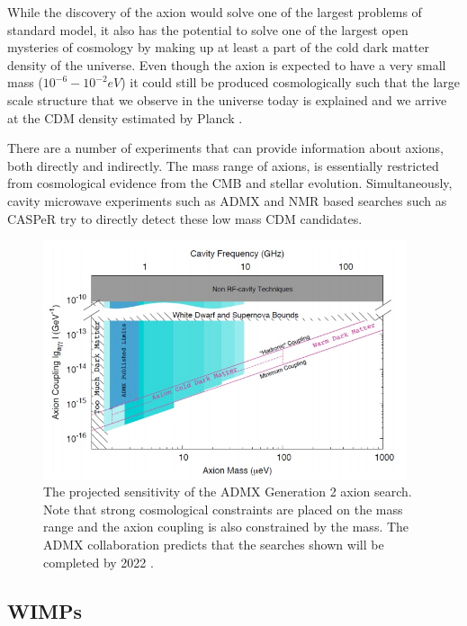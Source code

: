 While the discovery of the axion would solve one of the largest problems of standard model, it also has the potential to solve one of the largest open mysteries of cosmology by making up at least a part of the cold dark matter density of the universe.  Even though the axion is expected to have a very small mass ($10^{-6}-10^{-2} eV$) it could still be produced cosmologically such that the large scale structure that we observe in the universe today is explained and we arrive at the CDM density estimated by Planck \cite{graham2015experimental}.

    There are a number of experiments that can provide information about axions, both directly and indirectly.  The mass range of axions, is essentially restricted from cosmological evidence from the CMB and stellar evolution.  Simultaneously, cavity microwave experiments such as ADMX \cite{stern2016admx} and NMR based searches such as CASPeR \cite{garcon2017searching} try to directly detect these low mass CDM candidates.

\begin{figure}[t]
	\centering
	\includegraphics[width=0.95\textwidth]{admx2_limits}
	\caption{The projected sensitivity of the ADMX Generation 2 axion search.  Note that strong cosmological constraints are placed on the mass range and the axion coupling is also constrained by the mass.  The ADMX collaboration predicts that the searches shown will be completed by 2022 \cite{stern2016admx}.}
\end{figure}

\subsection{WIMPs}


